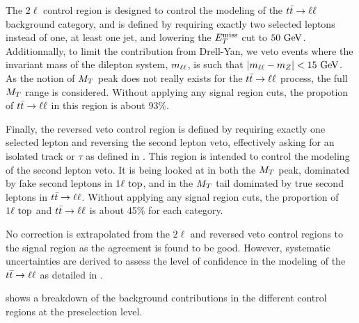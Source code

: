     The $2\ell$ control region is designed to control the modeling of the $t\bar{t} \rightarrow \ell \ell$
    background category, and is defined by requiring exactly two selected leptons instead
    of one, at least one jet, and lowering the $E_T^\text{miss}$ cut to $50 ~\text{GeV}$. Additionnally, to
    limit the contribution from Drell-Yan, we veto events where the invariant mass of the dilepton
    system, $m_{\ell\ell}$, is such that $\left|m_{\ell\ell} - m_{Z}\right| < 15 ~\text{GeV}$.
    As the notion of $M_T$ peak does not really exists for the $t\bar{t} \rightarrow \ell \ell$ process,
    the full $M_T$ range is considered. Without applying any signal region cuts, the
    propotion of $t\bar{t} \rightarrow \ell \ell$ in this region is about 93\%.

    Finally, the reversed veto control region is defined by requiring exactly one selected
    lepton and reversing the second lepton veto, effectively asking for an isolated track
    or $\tau$ as defined in . This region is intended to control
    the modeling of the second lepton veto. It is being looked at in both the $M_T$ peak,
    dominated by fake second leptons in $1\ell~\text{top}$, and in the $M_T$ tail dominated
    by true second leptons in $t\bar{t} \rightarrow \ell \ell$. Without applying any signal region cuts,
    the proportion of $1\ell~\text{top}$ and $t\bar{t} \rightarrow \ell \ell$ is about 45\% for each category.

    No correction is extrapolated from the $2\ell$ and reversed veto control regions
    to the signal region as the agreement is found to be good. However, systematic uncertainties
    are derived to assess the level of confidence in the modeling of the $t\bar{t} \rightarrow \ell \ell$ as
    detailed in .

     shows a breakdown of the background contributions
    in the different control regions at the preselection level.

